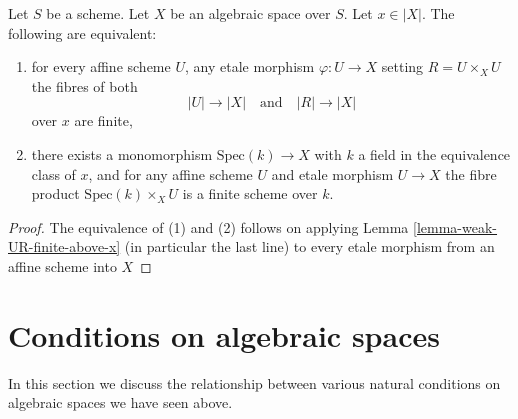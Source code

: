 \begin{lemma}
\label{lemma-UR-finite-above-x}
Let $S$ be a scheme. Let $X$ be an algebraic space over $S$.
Let $x \in |X|$. The following are equivalent:
\begin{enumerate}
\item for every affine scheme $U$, any etale morphism
$\varphi : U \to X$ setting $R = U \times_X U$ the fibres of both
$$
|U| \longrightarrow |X|
\quad\text{and}\quad
|R| \longrightarrow |X|
$$
over $x$ are finite,
\item there exists a monomorphism $\text{Spec}(k) \to X$ with $k$ a field
in the equivalence class of $x$, and for any affine scheme $U$ and etale
morphism $U \to X$ the fibre product $\text{Spec}(k) \times_X U$ is
a finite scheme over $k$.
\end{enumerate}
\end{lemma}

\begin{proof}
The equivalence of (1) and (2) follows on applying
Lemma \ref{lemma-weak-UR-finite-above-x} (in particular the last line)
to every etale morphism from an affine scheme into $X$
\end{proof}


















\section{Conditions on algebraic spaces}
\label{section-conditions}

\noindent
In this section we discuss the relationship between various natural
conditions on algebraic spaces we have seen above.

